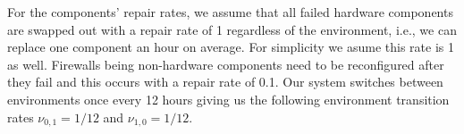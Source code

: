 \documentclass[12pt]{article}
\begin{document}
For the components' repair rates, we assume that all failed hardware
components are swapped out with a repair rate of 1 regardless of the
environment, i.e., we can replace one component an hour on average. \iffalse A
repair for a hardware component may also be having to restart that part of the
system if the component is in a dormant condition. \fi For simplicity we asume
this rate is 1 as well. Firewalls being non-hardware components need to be
reconfigured after they fail and this occurs with a repair rate of 0.1. Our
system switches between environments once every 12 hours giving us the
following environment transition rates $\nu_{0, 1} = 1 / 12$ and $\nu_{1, 0} =
1 / 12$.



\end{document}
